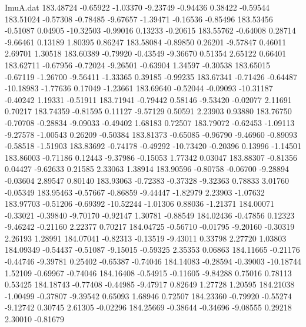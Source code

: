\begin{filecontents}{ImuA.dat}
 183.48724   -0.65922   -1.03370   -9.23749   -0.94436    0.38422   -0.59544
 183.51024   -0.57308   -0.78485   -9.67657   -1.39471   -0.16536   -0.85496
 183.53456   -0.51087    0.04905  -10.32503   -0.99016    0.13233   -0.20615
 183.55762   -0.64008    0.28714   -9.66461    0.13189    1.80395    0.86247
 183.58084   -0.89850    0.26201   -9.57847    0.46011    2.69701    1.30518
 183.60389   -0.79920   -0.43549   -9.36670    0.51354    2.65122    0.66401
 183.62711   -0.67956   -0.72024   -9.26501   -0.63904    1.34597   -0.30538
 183.65015   -0.67119   -1.26700   -9.56411   -1.33365    0.39185   -0.99235
 183.67341   -0.71426   -0.64487  -10.18983   -1.77636    0.17049   -1.23661
 183.69640   -0.52044   -0.09093  -10.31187   -0.40242    1.19331   -0.51911
 183.71941   -0.79442    0.58146   -9.53420   -0.02077    2.11691    0.70217
 183.74359   -0.81595    0.11127   -9.57129    0.50591    2.23903    0.93880
 183.76750   -0.70708   -0.28834   -9.09033   -0.49402    1.68183    0.72507
 183.79072   -0.62453   -1.09113   -9.27578   -1.00543    0.26209   -0.50384
 183.81373   -0.65085   -0.96790   -9.46960   -0.89093   -0.58518   -1.51903
 183.83692   -0.74178   -0.49292  -10.73420   -0.20396    0.13996   -1.14501
 183.86003   -0.71186    0.12443   -9.37986   -0.15053    1.77342    0.03047
 183.88307   -0.81356    0.04427   -9.62633    0.21585    2.33063    1.38914
 183.90596   -0.80758   -0.06700   -9.28894   -0.03604    2.89547    0.80140
 183.93063   -0.72383   -0.37328   -9.32363    0.78833    3.01760   -0.05349
 183.95463   -0.57667   -0.86859   -9.44447   -1.82979    2.23903   -1.07632
 183.97703   -0.51206   -0.69392  -10.52244   -1.01306    0.88036   -1.21371
 184.00071   -0.33021   -0.39840   -9.70170   -0.92147    1.30781   -0.88549
 184.02436   -0.47856    0.12323   -9.46242   -0.21160    2.22377    0.70217
 184.04725   -0.56710   -0.01795   -9.20160   -0.30319    2.26193    1.28991
 184.07041   -0.82313   -0.13519   -9.43011    0.33798    2.27720    1.03803
 184.09349   -0.54437   -0.51087   -9.15015   -0.59325    2.35353    0.06863
 184.11665   -0.21176   -0.44746   -9.39781    0.25402   -0.65387   -0.74046
 184.14083   -0.28594   -0.39003  -10.18744    1.52109   -0.69967   -0.74046
 184.16408   -0.54915   -0.11605   -9.84288    0.75016    0.78113    0.53425
 184.18743   -0.77408   -0.44985   -9.47917    0.82649    1.27728    1.20595
 184.21038   -1.00499   -0.37807   -9.39542    0.65093    1.68946    0.72507
 184.23360   -0.79920   -0.55274   -9.12742    0.30745    2.61305   -0.02296
 184.25669   -0.38644   -0.34696   -9.08555    0.29218    2.30010   -0.81679

\end{filecontents}

